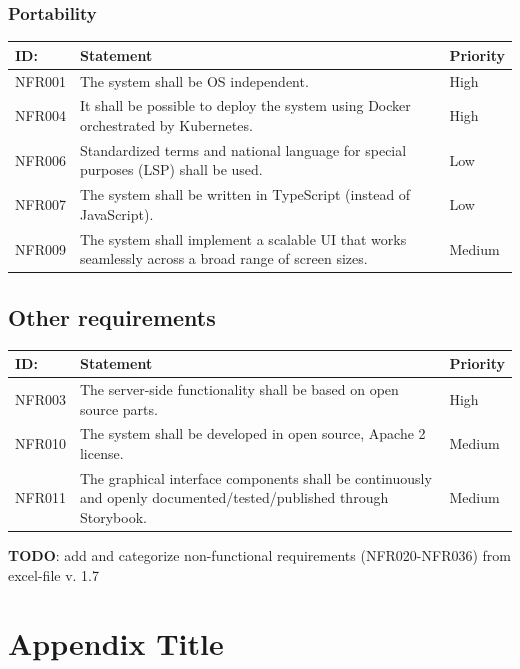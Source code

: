 \documentclass{scrreprt}
\begin{document}
\subsection{Portability}

\begin{center}
\begin{tabularx}{\linewidth}{| l | X | l |}
\hline
\textbf{ID:} & \textbf{Statement} & \textbf{Priority} \\
\hline
NFR001 & 
The system shall be OS independent. &
High \\ 
\hline
NFR004 & 
It shall be possible to deploy the system using Docker orchestrated by Kubernetes.&
High \\ 
\hline
NFR006 & 
Standardized terms and national language for special purposes (LSP) shall be used. &
Low \\ 
\hline
NFR007 & 
The system shall be written in TypeScript (instead of JavaScript).&
Low \\ 
\hline
NFR009 & 
The system shall implement a scalable UI that works seamlessly across a broad range of screen sizes. &
Medium \\ 
\hline
\end{tabularx}
\end{center}


\section{Other requirements}

\begin{center}
\begin{tabularx}{\linewidth}{| l | X | l |}
\hline
\textbf{ID:} & \textbf{Statement} & \textbf{Priority} \\
\hline
NFR003 & 
The server-side functionality shall be based on open source parts. &
High \\ 
\hline
NFR010 & 
The system shall be developed in open source, Apache 2 license. &
Medium \\ 
\hline
NFR011 & 
The graphical interface components shall be continuously and openly documented/tested/published through Storybook. &
Medium \\ 
\hline
\end{tabularx}
\end{center}


\textbf{TODO}: add and categorize non-functional requirements (NFR020-NFR036) from excel-file v. 1.7 


\appendix
\chapter{Appendix Title}

\end{document}
